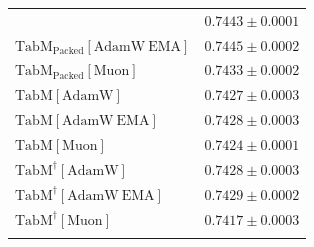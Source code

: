\begin{longtable}{p{}p{}}
{\begin{tabular}{ll}
{\footnotesize $\mathrm{TabM_{\text{Packed}}[AdamW]}$ } & {\footnotesize$0.7443 \pm 0.0001$}\\ 
{\footnotesize $\mathrm{TabM_{\text{Packed}}[AdamW\ EMA]}$ } & {\footnotesize$0.7445 \pm 0.0002$}\\ 
{\footnotesize $\mathrm{TabM_{\text{Packed}}[Muon]}$ } & {\footnotesize$0.7433 \pm 0.0002$}\\ 
{\footnotesize $\mathrm{TabM[AdamW]}$ } & {\footnotesize$0.7427 \pm 0.0003$}\\ 
{\footnotesize $\mathrm{TabM[AdamW\ EMA]}$ } & {\footnotesize$0.7428 \pm 0.0003$}\\ 
{\footnotesize $\mathrm{TabM[Muon]}$ } & {\footnotesize$0.7424 \pm 0.0001$}\\ 
{\footnotesize $\mathrm{TabM^\dagger[AdamW]}$ } & {\footnotesize$0.7428 \pm 0.0003$}\\ 
{\footnotesize $\mathrm{TabM^\dagger[AdamW\ EMA]}$ } & {\footnotesize$0.7429 \pm 0.0002$}\\ 
{\footnotesize $\mathrm{TabM^\dagger[Muon]}$ } & {\footnotesize$0.7417 \pm 0.0003$}\\ 
\bottomrule
\end{tabular}}

& 

\\

\end{longtable}